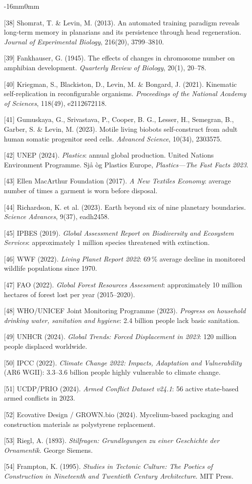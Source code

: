 \documentclass[10pt,oneside]{book}
\newcommand{\refentry}[1]{%
  \par\addvspace{0pt}%
  \begingroup\footnotesize\linespread{0.92}\selectfont
  \noindent\hangindent=4mm\hangafter=1 #1\par%
  \endgroup
}
\newenvironment{widebody}{%
  \begin{adjustwidth}{-16mm}{0mm}%
}{%
  \end{adjustwidth}%
}
\begin{document}
\begin{widebody}
\refentry{[38] Shomrat, T. \& Levin, M. (2013). An automated training paradigm reveals long-term memory in planarians and its persistence through head regeneration. \textit{Journal of Experimental Biology}, 216(20), 3799--3810.}
\refentry{[39] Fankhauser, G. (1945). The effects of changes in chromosome number on amphibian development. \textit{Quarterly Review of Biology}, 20(1), 20--78.}
\refentry{[40] Kriegman, S., Blackiston, D., Levin, M. \& Bongard, J. (2021). Kinematic self-replication in reconfigurable organisms. \textit{Proceedings of the National Academy of Sciences}, 118(49), e2112672118.}
\refentry{[41] Gumuskaya, G., Srivastava, P., Cooper, B. G., Lesser, H., Semegran, B., Garber, S. \& Levin, M. (2023). Motile living biobots self-construct from adult human somatic progenitor seed cells. \textit{Advanced Science}, 10(34), 2303575.}
\refentry{[42] UNEP (2024). \textit{Plastics}: annual global production. United Nations Environment Programme. Sjå òg Plastics Europe, \textit{Plastics---The Fast Facts 2023}.}
\refentry{[43] Ellen MacArthur Foundation (2017). \textit{A New Textiles Economy}: average number of times a garment is worn before disposal.}
\refentry{[44] Richardson, K. et al. (2023). Earth beyond six of nine planetary boundaries. \textit{Science Advances}, 9(37), eadh2458.}
\refentry{[45] IPBES (2019). \textit{Global Assessment Report on Biodiversity and Ecosystem Services}: approximately 1 million species threatened with extinction.}
\refentry{[46] WWF (2022). \textit{Living Planet Report 2022}: 69\,\% average decline in monitored wildlife populations since 1970.}
\refentry{[47] FAO (2022). \textit{Global Forest Resources Assessment}: approximately 10 million hectares of forest lost per year (2015--2020).}
\refentry{[48] WHO/UNICEF Joint Monitoring Programme (2023). \textit{Progress on household drinking water, sanitation and hygiene}: 2.4 billion people lack basic sanitation.}
\refentry{[49] UNHCR (2024). \textit{Global Trends: Forced Displacement in 2023}: 120 million people displaced worldwide.}
\refentry{[50] IPCC (2022). \textit{Climate Change 2022: Impacts, Adaptation and Vulnerability} (AR6 WGII): 3.3--3.6 billion people highly vulnerable to climate change.}
\refentry{[51] UCDP/PRIO (2024). \textit{Armed Conflict Dataset v24.1}: 56 active state-based armed conflicts in 2023.}
\refentry{[52] Ecovative Design / GROWN.bio (2024). Mycelium-based packaging and construction materials as polystyrene replacement.}
\refentry{[53] Riegl, A. (1893). \textit{Stilfragen: Grundlegungen zu einer Geschichte der Ornamentik}. George Siemens.}
\refentry{[54] Frampton, K. (1995). \textit{Studies in Tectonic Culture: The Poetics of Construction in Nineteenth and Twentieth Century Architecture}. MIT Press.}

\end{widebody}
\end{document}
